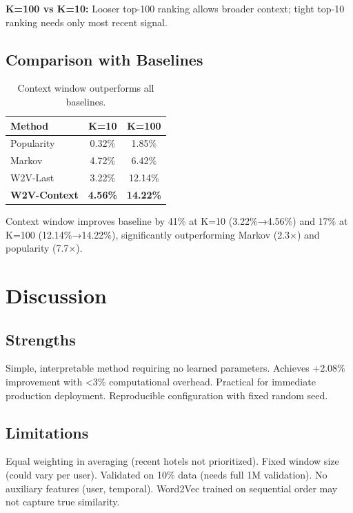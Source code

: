 \documentclass[sigconf]{acmart}
\begin{document}
\textbf{K=100 vs K=10:} Looser top-100 ranking allows broader context; tight top-10 ranking needs only most recent signal.

\subsection{Comparison with Baselines}

\begin{table}[h]
\centering
\small
\begin{tabular}{lcc}
\toprule
\textbf{Method} & \textbf{K=10} & \textbf{K=100} \\
\midrule
Popularity & 0.32\% & 1.85\% \\
Markov & 4.72\% & 6.42\% \\
W2V-Last & 3.22\% & 12.14\% \\
\textbf{W2V-Context} & \textbf{4.56\%} & \textbf{14.22\%} \\
\bottomrule
\end{tabular}
\caption{Context window outperforms all baselines.}
\label{tab:baselines}
\end{table}

Context window improves baseline by 41\% at K=10 (3.22\%→4.56\%) and 17\% at K=100 (12.14\%→14.22\%), significantly outperforming Markov (2.3×) and popularity (7.7×).

\section{Discussion}

\subsection{Strengths}

Simple, interpretable method requiring no learned parameters. Achieves +2.08\% improvement with <3\% computational overhead. Practical for immediate production deployment. Reproducible configuration with fixed random seed.

\subsection{Limitations}

Equal weighting in averaging (recent hotels not prioritized). Fixed window size (could vary per user). Validated on 10\% data (needs full 1M validation). No auxiliary features (user, temporal). Word2Vec trained on sequential order may not capture true similarity.
\end{document}
